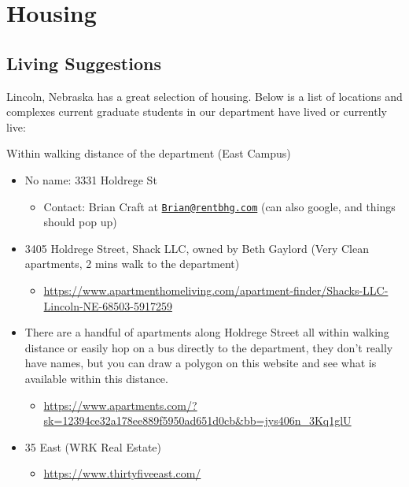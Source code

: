\documentclass[
  12pt,
]{book}
\providecommand{\tightlist}{%
  \setlength{\itemsep}{0pt}\setlength{\parskip}{0pt}}
\begin{document}
\hypertarget{housing}{%
\chapter{Housing}\label{housing}}

\hypertarget{living-suggestions}{%
\section{Living Suggestions}\label{living-suggestions}}

Lincoln, Nebraska has a great selection of housing. Below is a list of locations and complexes current graduate students in our department have lived or currently live:

Within walking distance of the department (East Campus)

\begin{itemize}
\tightlist
\item
  No name: 3331 Holdrege St

  \begin{itemize}
  \tightlist
  \item
    Contact: Brian Craft at \href{mailto:Brian@rentbhg.com}{\nolinkurl{Brian@rentbhg.com}} (can also google, and things should pop up)
  \end{itemize}
\item
  3405 Holdrege Street, Shack LLC, owned by Beth Gaylord (Very Clean apartments, 2 mins walk to the department)

  \begin{itemize}
  \tightlist
  \item
    \url{https://www.apartmenthomeliving.com/apartment-finder/Shacks-LLC-Lincoln-NE-68503-5917259}
  \end{itemize}
\item
  There are a handful of apartments along Holdrege Street all within walking distance or easily hop on a bus directly to the department, they don't really have names, but you can draw a polygon on this website and see what is available within this distance.

  \begin{itemize}
  \tightlist
  \item
    \url{https://www.apartments.com/?sk=12394ce32a178ee889f5950ad651d0cb\&bb=jys406n_3Kq1glU}
  \end{itemize}
\item
  35 East (WRK Real Estate)

  \begin{itemize}
  \tightlist
  \item
    \url{https://www.thirtyfiveeast.com/}
  \end{itemize}
\end{itemize}
\end{document}
